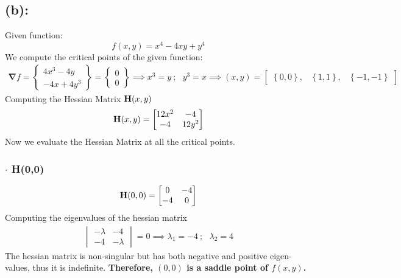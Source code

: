 \subsection*{(b): }
Given function:
\[
f(x,y)
=
x^4 - 4xy + y^4
\]
We compute the critical points of the given function: 
\begin{align*}
\bm\nabla f
=
\begin{Bmatrix}
4x^3 - 4y \\
-4x + 4y^3
\end{Bmatrix}
=
\begin{Bmatrix}
0\\0
\end{Bmatrix}\implies x^3 = y\ ; \ \ \ y^3 = x \implies (x,y) = \begin{bmatrix}
\left\{0,0 \right\}, & \left\{1,1 \right\}, & \left\{-1,-1 \right\} 
\end{bmatrix}
\end{align*}
Computing the Hessian Matrix ${\bf H}(x,y)$
\begin{align*}
{\bf H}(x,y) = 
\begin{bmatrix}
12x^2 & -4 \\
-4 & 12y^2
\end{bmatrix}
\end{align*}
Now we evaluate the Hessian Matrix at all the critical points.
\subsubsection*{$\bm\cdot$ H(0,0)}
\begin{align*}
{\bf H} (0,0) =
\begin{bmatrix}
0 & -4 \\
-4 & 0
\end{bmatrix}
\end{align*}
Computing the eigenvalues of the hessian matrix
\begin{align*}
\begin{vmatrix}
-\lambda & -4 \\
-4 & -\lambda
\end{vmatrix} = 0 \implies \lambda_1 = -4\ ; \ \ \ \lambda_2 = 4
\end{align*}
The hessian matrix is non-singular but has both negative and positive eigen-values, thus it is indefinite. {\bf Therefore, $(0,0)$ is a saddle point of $f(x,y)$.} 
